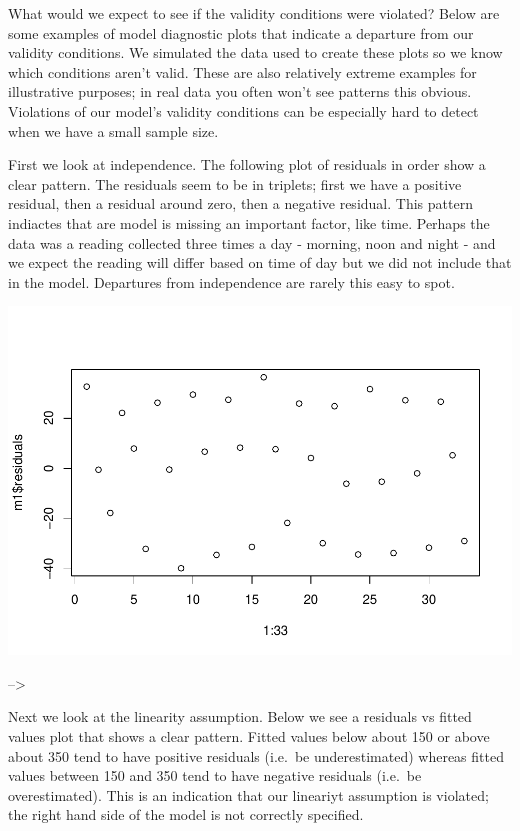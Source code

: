 \documentclass[
]{book}
\begin{document}
What would we expect to see if the validity conditions were violated? Below are some examples of model diagnostic plots that indicate a departure from our validity conditions. We simulated the data used to create these plots so we know which conditions aren't valid. These are also relatively extreme examples for illustrative purposes; in real data you often won't see patterns this obvious. Violations of our model's validity conditions can be especially hard to detect when we have a small sample size.

First we look at independence. The following plot of residuals in order show a clear pattern. The residuals seem to be in triplets; first we have a positive residual, then a residual around zero, then a negative residual. This pattern indiactes that are model is missing an important factor, like time. Perhaps the data was a reading collected three times a day - morning, noon and night - and we expect the reading will differ based on time of day but we did not include that in the model. Departures from independence are rarely this easy to spot.

\includegraphics{MA206supplement_files/figure-latex/unnamed-chunk-10-1.pdf}

--\textgreater{}

Next we look at the linearity assumption. Below we see a residuals vs fitted values plot that shows a clear pattern. Fitted values below about 150 or above about 350 tend to have positive residuals (i.e.~be underestimated) whereas fitted values between 150 and 350 tend to have negative residuals (i.e.~be overestimated). This is an indication that our lineariyt assumption is violated; the right hand side of the model is not correctly specified.
\end{document}
